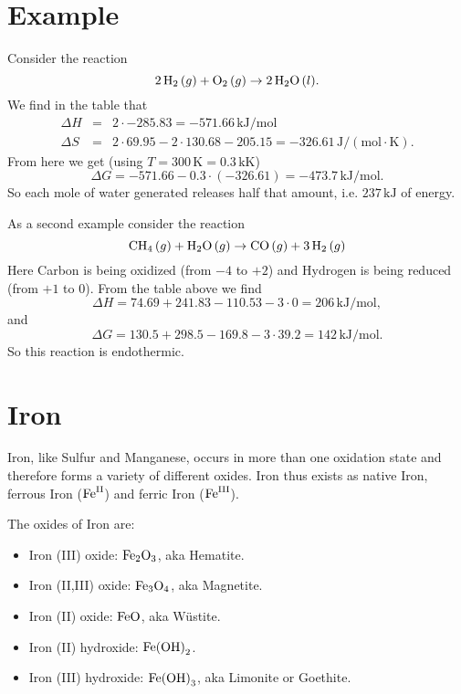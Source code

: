 \documentclass[a4paper,14pt]{extarticle}
\def\H{{\rm H}}
\def\O{{\rm O}}
\def\C{{\rm C}}
\def\Fe{{\rm Fe}}
\def\II{{\rm II}}
\def\III{{\rm III}}
\begin{document}

\section{Example}

Consider the reaction
\[
    2 \,\H_2 \,(g) + \O_2 \,(g) \rightarrow 2 \,\H_2\O \,(l).
\]
We find in the table that
\[
    \begin{array}{rcl}
        \Delta H &=& 2 \cdot -285.83 = -571.66 \,\text{kJ}/\text{mol} \\
        \Delta S &=& 2 \cdot 69.95 - 2 \cdot 130.68 - 205.15 = -326.61 \,\text{J}/(\text{mol}\cdot \text{K}).
    \end{array}
\]
From here we get (using $T = 300 \,\text{K} = 0.3 \,\text{kK}$)
\[
    \Delta G = -571.66 - 0.3 \cdot (-326.61) = -473.7 \,\text{kJ}/\text{mol}.
\]
So each mole of water generated releases half that amount, i.e. $237 \,\text{kJ}$ of energy.

As a second example consider the reaction
\[
    \C\H_4 \,(g)+ \H_2\O \,(g)\rightarrow \C\O \,(g)+ 3\,\H_2\,(g)
\]
Here Carbon is being oxidized (from $-4$ to $+2$) and Hydrogen is being reduced (from $+1$ to $0$).
From the table above we find
\[
    \Delta H = 74.69 + 241.83 - 110.53 - 3\cdot 0 = 206 \,\text{kJ}/\text{mol},
\]
and
\[
    \Delta G = 130.5 + 298.5 - 169.8 - 3\cdot 39.2 = 142 \,\text{kJ}/\text{mol}.
\]
So this reaction is endothermic.


\section{Iron}
Iron, like Sulfur and Manganese, occurs in more than one oxidation state and therefore forms a variety of different
oxides.  Iron thus exists as native Iron, ferrous Iron ($\Fe^{\II}$) and ferric Iron ($\Fe^{\III}$).

The oxides of Iron are:

\begin{itemize}
    \item Iron (III) oxide: $\Fe_2\O_3$, aka Hematite.
    \item Iron (II,III) oxide: $\Fe_3\O_4$, aka Magnetite.
    \item Iron (II) oxide: $\Fe\O$, aka Wüstite.
    \item Iron (II) hydroxide: $\Fe{(\O\H)}_2$.
    \item Iron (III) hydroxide: $\Fe{(\O\H)}_3$, aka Limonite or Goethite.
\end{itemize}
\end{document}
